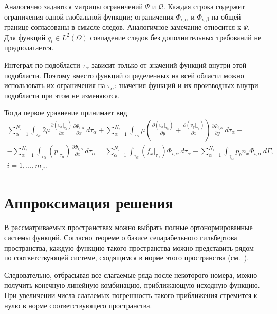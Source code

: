 \documentclass[a4paper,14pt]{extarticle}
\begin{document}
Аналогично задаются матрицы ограничений $\Psi$ и $\mathcal Q$.
Каждая строка содержит ограничения одной глобальной функции;
ограничения $\Phi_{i,\alpha}$ и $\Phi_{i,\beta}$ на общей
границе согласованы в смысле следов. Аналогичное замечание
относится к $\Psi$. Для функций $q_i\in L^2(\Omega)$
совпадение следов без дополнительных требований не предполагается.

Интеграл по подобласти $\tau_\alpha$ зависит только от
значений функций внутри этой подобласти. Поэтому вместо
функций определенных на всей области можно использовать их ограничения на $\tau_\alpha$: значения функций и их производных внутри подобласти при этом не изменяются.

Тогда первое уравнение принимает вид
\begin{equation}
	\begin{gathered}
		\sum_{\alpha=1}^{N_\tau}
		\int_{\tau_\alpha}
		2\mu
		\frac{\partial\left(v_x|_{\tau_\alpha}\right)}{\partial x}
		\frac{\partial\Phi_{i,\alpha}}{\partial x}
		\,d\tau_\alpha
		+
		\sum_{\alpha=1}^{N_\tau}
		\int_{\tau_\alpha}
		\mu\left(
			\frac{\partial\left(v_x|_{\tau_\alpha}\right)}{\partial y}
			+
			\frac{\partial\left(v_y|_{\tau_\alpha}\right)}{\partial x}
		\right)
		\frac{\partial\Phi_{i,\alpha}}{\partial y}
		\,d\tau_\alpha
		-\\[6pt]
		-
		\sum_{\alpha=1}^{N_\tau}
		\int_{\tau_\alpha}
		\left(p|_{\tau_\alpha}\right)
		\frac{\partial\Phi_{i,\alpha}}{\partial x}
		\,d\tau_\alpha
		=
		\sum_{\alpha=1}^{N_\tau}
		\int_{\tau_\alpha}
		\left(f_x|_{\tau_\alpha}\right)
		\Phi_{i,\alpha}\,d\tau_\alpha
		-
		\sum_{\alpha=1}^{N_\tau}
		\int_{\gamma_\alpha}
		p_b n_x\Phi_{i,\alpha}\,d\Gamma,
		\\[6pt]
		i=1,\ldots,m_\varphi.
	\end{gathered}
	\label{eq:restriction_x}
\end{equation}



\section{Аппроксимация решения}

В рассматриваемых пространствах можно выбрать полные
ортонормированные системы функций. Согласно теореме о базисе
сепарабельного гильбертова пространства, каждую функцию
такого пространства можно представить рядом по соответствующей
системе, сходящимся в норме этого пространства
(см.~\cite{hilbert_basis}).

Следовательно, отбрасывая все слагаемые ряда после некоторого
номера, можно получить конечную линейную комбинацию,
приближающую исходную функцию. При увеличении числа слагаемых
погрешность такого приближения стремится к нулю в норме
соответствующего пространства.
\end{document}
